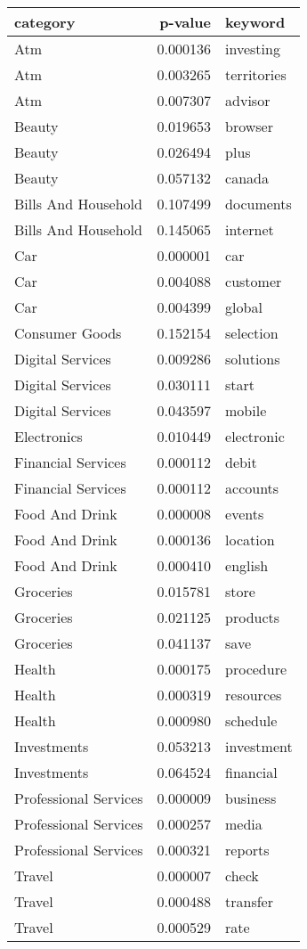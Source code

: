\begin{tabular}{lrl}
\toprule
             category &  p-value &     keyword \\
\midrule
                  Atm & 0.000136 &   investing \\
                  Atm & 0.003265 & territories \\
                  Atm & 0.007307 &     advisor \\
               Beauty & 0.019653 &     browser \\
               Beauty & 0.026494 &        plus \\
               Beauty & 0.057132 &      canada \\
  Bills And Household & 0.107499 &   documents \\
  Bills And Household & 0.145065 &    internet \\
                  Car & 0.000001 &         car \\
                  Car & 0.004088 &    customer \\
                  Car & 0.004399 &      global \\
       Consumer Goods & 0.152154 &   selection \\
     Digital Services & 0.009286 &   solutions \\
     Digital Services & 0.030111 &       start \\
     Digital Services & 0.043597 &      mobile \\
          Electronics & 0.010449 &  electronic \\
   Financial Services & 0.000112 &       debit \\
   Financial Services & 0.000112 &    accounts \\
       Food And Drink & 0.000008 &      events \\
       Food And Drink & 0.000136 &    location \\
       Food And Drink & 0.000410 &     english \\
            Groceries & 0.015781 &       store \\
            Groceries & 0.021125 &    products \\
            Groceries & 0.041137 &        save \\
               Health & 0.000175 &   procedure \\
               Health & 0.000319 &   resources \\
               Health & 0.000980 &    schedule \\
          Investments & 0.053213 &  investment \\
          Investments & 0.064524 &   financial \\
Professional Services & 0.000009 &    business \\
Professional Services & 0.000257 &       media \\
Professional Services & 0.000321 &     reports \\
               Travel & 0.000007 &       check \\
               Travel & 0.000488 &    transfer \\
               Travel & 0.000529 &        rate \\
\bottomrule
\end{tabular}

